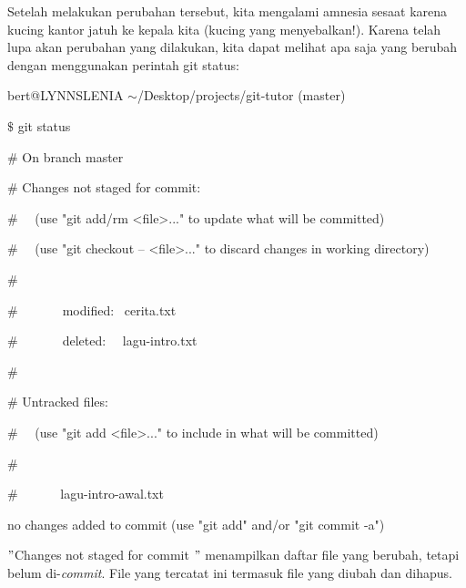 \hspace*{0.50in} Setelah melakukan perubahan tersebut, kita mengalami amnesia sesaat karena kucing kantor jatuh ke kepala kita (kucing yang menyebalkan!). Karena telah lupa akan perubahan yang dilakukan, kita dapat melihat apa saja yang berubah dengan menggunakan perintah git status: \par
\noindent 
{\fontsize{10pt}{10pt}\selectfont bert@LYNNSLENIA  $  \sim  $/Desktop/projects/git-tutor (master)} \par
\noindent 
{\fontsize{10pt}{10pt}\selectfont  $  \$  $ git status} \par
\noindent 
{\fontsize{10pt}{10pt}\selectfont  $  \#  $ On branch master} \par
\noindent 
{\fontsize{10pt}{10pt}\selectfont  $  \#  $ Changes not staged for commit:} \par
\noindent 
{\fontsize{10pt}{10pt}\selectfont  $  \#  $~~ (use "git add/rm <file>..." to update what will be committed)} \par
\noindent 
{\fontsize{10pt}{10pt}\selectfont  $  \#  $~~ (use "git checkout -- <file>..." to discard changes in working directory)} \par
\noindent 
{\fontsize{10pt}{10pt}\selectfont  $  \#  $} \par
\noindent 
{\fontsize{10pt}{10pt}\selectfont  $  \#  $~~~~~~~modified:~  cerita.txt} \par
\noindent 
{\fontsize{10pt}{10pt}\selectfont  $  \#  $~~~~~~~deleted:~~  lagu-intro.txt} \par
\noindent 
{\fontsize{10pt}{10pt}\selectfont  $  \#  $} \par
\noindent 
{\fontsize{10pt}{10pt}\selectfont  $  \#  $ Untracked files:} \par
\noindent 
{\fontsize{10pt}{10pt}\selectfont  $  \#  $~~ (use "git add <file>..." to include in what will be committed)} \par
\noindent 
{\fontsize{10pt}{10pt}\selectfont  $  \#  $} \par
\noindent 
{\fontsize{10pt}{10pt}\selectfont  $  \#  $~~~~~~ lagu-intro-awal.txt} \par
\noindent 
{\fontsize{10pt}{10pt}\selectfont no changes added to commit (use "git add" and/or "git commit -a")} \par
\vspace{12pt}
\noindent 
\hspace*{0.50in} $ " $Changes not staged for commit $ " $ menampilkan daftar file yang berubah, tetapi belum di-\textit{commit}. File yang tercatat ini termasuk file yang diubah dan dihapus. \par
